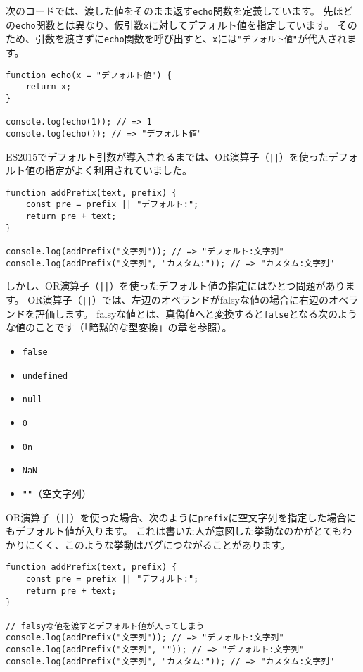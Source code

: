 次のコードでは、渡した値をそのまま返す\texttt{echo}関数を定義しています。
先ほどの\texttt{echo}関数とは異なり、仮引数\texttt{x}に対してデフォルト値を指定しています。
そのため、引数を渡さずに\texttt{echo}関数を呼び出すと、\texttt{x}には\texttt{"デフォルト値"}が代入されます。

\begin{lstlisting}
function echo(x = "デフォルト値") {
    return x;
}

console.log(echo(1)); // => 1
console.log(echo()); // => "デフォルト値"
\end{lstlisting}

ES2015でデフォルト引数が導入されるまでは、OR演算子（\texttt{||}）を使ったデフォルト値の指定がよく利用されていました。

\begin{lstlisting}
function addPrefix(text, prefix) {
    const pre = prefix || "デフォルト:";
    return pre + text;
}

console.log(addPrefix("文字列")); // => "デフォルト:文字列"
console.log(addPrefix("文字列", "カスタム:")); // => "カスタム:文字列"
\end{lstlisting}

しかし、OR演算子（\texttt{||}）を使ったデフォルト値の指定にはひとつ問題があります。
OR演算子（\texttt{||}）では、左辺のオペランドがfalsyな値の場合に右辺のオペランドを評価します。
falsyな値とは、真偽値へと変換すると\texttt{false}となる次のような値のことです（「\hyperlink{implicit-coercion}{暗黙的な型変換}」の章を参照）。

\begin{itemize}
\item
  \texttt{false}
\item
  \texttt{undefined}
\item
  \texttt{null}
\item
  \texttt{0}
\item
  \texttt{0n}
\item
  \texttt{NaN}
\item
  \texttt{""}（空文字列）
\end{itemize}

OR演算子（\texttt{||}）を使った場合、次のように\texttt{prefix}に空文字列を指定した場合にもデフォルト値が入ります。
これは書いた人が意図した挙動なのかがとてもわかりにくく、このような挙動はバグにつながることがあります。

\begin{lstlisting}
function addPrefix(text, prefix) {
    const pre = prefix || "デフォルト:";
    return pre + text;
}

// falsyな値を渡すとデフォルト値が入ってしまう
console.log(addPrefix("文字列")); // => "デフォルト:文字列"
console.log(addPrefix("文字列", "")); // => "デフォルト:文字列"
console.log(addPrefix("文字列", "カスタム:")); // => "カスタム:文字列"
\end{lstlisting}

